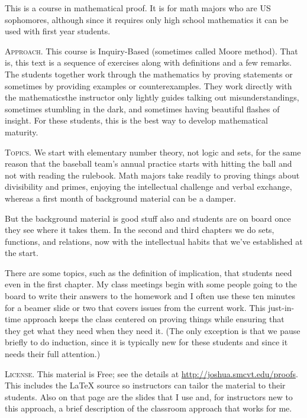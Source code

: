 \documentclass{ibl}
\begin{document}
This is a course in mathematical proof. 
It is for math majors who are US sophomores, although since
it requires only high school mathematics
it can be used with first year students.



\medskip
\noindent\textsc{Approach.}
This course is Inquiry-Based (sometimes called Moore method).
That is, this text is a sequence of exercises
along with definitions and a few 
remarks.
The students together work through the mathematics by
proving statements or sometimes by providing examples or counterexamples.
They work directly with the mathematics\Dash the instructor only 
lightly guides\Dash
talking out misunderstandings, 
sometimes stumbling in the dark, and sometimes
having beautiful flashes of insight.
For these students, 
this is the best way to develop mathematical maturity.


\medskip
\noindent\textsc{Topics.}
We start with elementary number theory, not logic and sets, 
for the same reason
that the baseball team's annual practice starts with hitting the ball and 
not with reading the rulebook.
Math majors take readily to proving things about
divisibility and primes, enjoying the 
intellectual challenge and verbal exchange, 
whereas a first month of background material can be a damper.

But the background material is good stuff also and 
students are on board once they see where it takes them.
In the second and third chapters we do
sets, functions, and relations, now with the
intellectual habits that we've established at the start.

There are some topics, such as the definition of implication, 
that students need even in the
first chapter.
My class meetings begin with some people going to the 
board to write their answers to the homework and 
I often use these ten minutes for a beamer slide or two that covers issues from
the current work.
This just-in-time approach keeps the class centered 
on proving things while ensuring that they get what
they need when they need it.
(The only exception is that we pause briefly to do induction,
since it is typically new for these students and since it needs 
their full attention.)



\medskip
\noindent\textsc{License.}
This material is Free; see the details  
at \url{http://joshua.smcvt.edu/proofs}.
This includes the \LaTeX{} source so instructors can tailor the
material to their students.  
Also on that page are the slides that I use
and, for instructors new to this approach, 
a brief description of the classroom approach that works for me.
\end{document}
